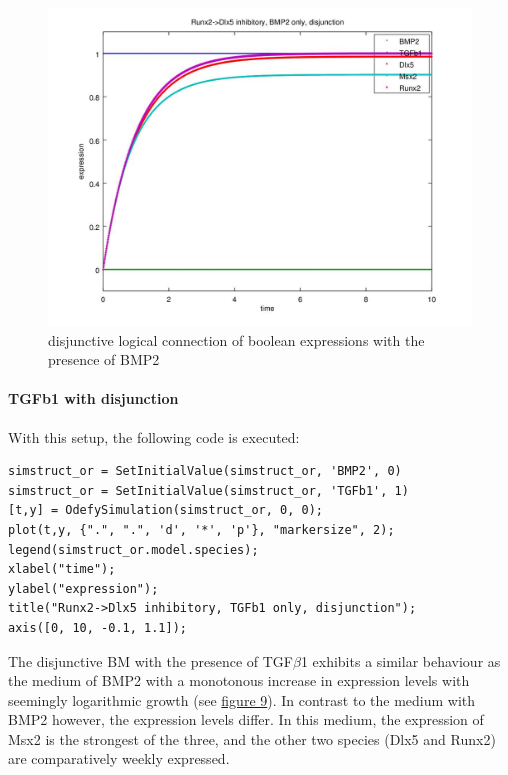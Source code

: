 \documentclass[11pt]{article}
\begin{document}
\begin{figure}[!htb]
	\centering
	\includegraphics[scale=0.55]{case4.jpg}
	\caption{\label{fourthCase} disjunctive logical connection of boolean expressions with the presence of BMP2}
\end{figure}

\paragraph{TGFb1 with disjunction}
With this setup, the following code is executed:
\begin{lstlisting}
simstruct_or = SetInitialValue(simstruct_or, 'BMP2', 0)
simstruct_or = SetInitialValue(simstruct_or, 'TGFb1', 1)
[t,y] = OdefySimulation(simstruct_or, 0, 0);
plot(t,y, {".", ".", 'd', '*', 'p'}, "markersize", 2);
legend(simstruct_or.model.species);
xlabel("time");
ylabel("expression");
title("Runx2->Dlx5 inhibitory, TGFb1 only, disjunction");
axis([0, 10, -0.1, 1.1]);
\end{lstlisting}
The disjunctive BM with the presence of TGF$\beta$1 exhibits a similar behaviour as the medium of BMP2 with a monotonous increase in expression levels with seemingly logarithmic growth (see \hyperref[fifthCase]{figure 9}). In contrast to the medium with BMP2 however, the expression levels differ. In this medium, the expression of Msx2 is the strongest of the three, and the other two species (Dlx5 and Runx2) are comparatively weekly expressed.
\end{document}
